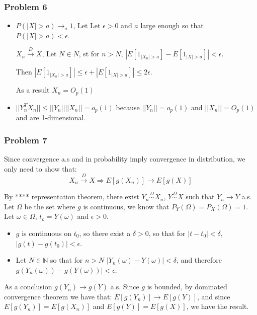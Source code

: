 \documentclass[12pt]{article}
\newcommand{\Q}[1]{\subsubsection*{Problem #1}}
\begin{document}
\Q{6}
\begin{itemize}
\item
  $P(|X| > a)  \rightarrow_a 1$, Let
  Let $\epsilon > 0$ and $a$ large enough so that $P(|X| > a) < \epsilon$.
  
  $X_n \overset{D}{\rightarrow} X$,
  Let $N \in N$, st for
  $n > N$,
  $|E[1_{|X_n| > a}]  - E[1_{|X| > a}]| < \epsilon$.
  
  Then $|E[1_{|X_n| > a}]| \le \epsilon + |E[1_{|X| > a}]| \le 2\epsilon$.
  
  As a result $X_n = O_p(1)$

\item 
  $||Y_n^TX_n|| \le ||Y_n|| ||X_n|| = o_p(1)$ because $||Y_n|| = o_p(1)$ and $||X_n|| = O_p(1)$ and are 1-dimensional.


\end{itemize}
\Q{7}
Since convergence a.s and in probability imply convergence in distribution, we only need to show that:
$$X_n \overset{D}{\rightarrow} X \Rightarrow E[g(X_n)] \rightarrow E[g(X)]$$

By **** representation theorem, there exist $Y_n \overset{D}{\sim} X_n$, $Y \overset{D}{\sim} X$ such that $Y_n \rightarrow Y$ a.s.
Let $\Omega$ be the set where $g$ is continuous, we know that $P_Y(\Omega) = P_X(\Omega) = 1$. 
Let $\omega \in \Omega$, $t_o = Y(\omega)$ and $\epsilon > 0$.
\begin{itemize}
\item 
$g$ is continuous on $t_0$, so there exist a $\delta > 0$, so that for $|t - t_0| < \delta$, $|g(t) - g(t_0)| < \epsilon$.
\item 
Let $N \in \mathbb{N}$ so that for $n > N$
$|Y_n(\omega) - Y(\omega)| < \delta$, and therefore $g(Y_n(\omega)) - g(Y(\omega))| < \epsilon$.
\end{itemize}
As a conclusion $g(Y_n) \rightarrow g(Y)$ a.s.
Since $g$ is bounded, by dominated convergence theorem we have that: $E[g(Y_n)] \rightarrow E[g(Y)]$, and since $E[g(Y_n)] = E[g(X_n)]$ and $E[g(Y)] = E[g(X)]$, we have the result.
\end{document}
